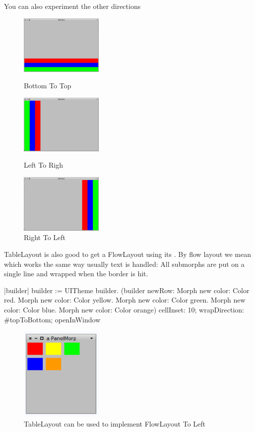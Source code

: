 \documentclass[a4paper,10pt,twoside]{book}
\begin{document}
You can also experiment the other directions

\begin{figure}[ht]\centering
	\includegraphics[width=4cm]{TableLayout3}
	\caption{Bottom To Top}
	\label{fig:tableLayout3}
	\includegraphics[width=4cm]{TableLayout4}
	\caption{Left To Righ}
	\label{fig:tableLayout4}
	\includegraphics[width=4cm]{TableLayout5}
	\caption{Right To Left}
	\label{fig:tableLayout5}
\end{figure}


TableLayout is also good to get a FlowLayout using its .
By flow layout we mean  which works the same way usually text is handled:
All submorphs are put on a single line and wrapped when the border is hit.

\begin{code}{}
|builder|
builder := UITheme builder.
(builder newRow: {
   Morph new color: Color red.
   Morph new color: Color yellow.
   Morph new color: Color green.
   Morph new color: Color blue.
   Morph new color: Color orange})
      cellInset: 10;
      wrapDirection: #topToBottom;
      openInWindow
\end{code}

\begin{figure}[ht]\centering
	\includegraphics[width=4cm]{FlowLayout}
	\caption{TableLayout can be used to implement FlowLayout To Left}
	\label{fig:tableLayout5}
\end{figure}
\end{document}
